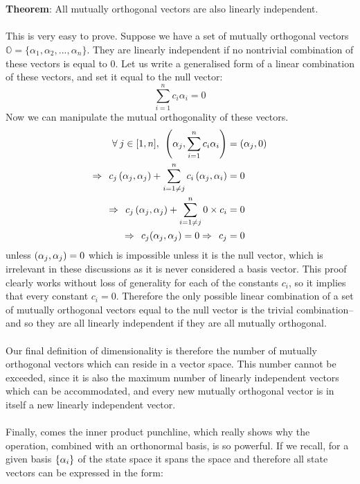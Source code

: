 \\\\
\textbf{Theorem}: All mutually orthogonal vectors are also linearly independent.
\\\\
This is very easy to prove. Suppose we have a set of mutually orthogonal vectors $\mathbb{O}=\{\alpha_{1}, \alpha_{2}, ..., \alpha_{n}\}$. They are linearly independent if no nontrivial combination of these vectors is equal to $0$. Let us write a generalised form of a linear combination of these vectors, and set it equal to the null vector:
$$
\sum_{i=1}^{n}c_{i}\alpha_{i}=0
$$
Now we can manipulate the mutual orthogonality of these vectors. 
$$
\begin{aligned}
\forall\: j \in [1,n], \:\: \left(\alpha_{j},\sum_{i=1}^{n}c_{i}\alpha_{i}\right) &=\left(\alpha_{j},0\right) \\ 
\Rightarrow\:\:  c_{j}\left(\alpha_{j},\alpha_{j}\right)+\sum_{i=1\neq j}^{n}c_{i}\left(\alpha_{j},\alpha_{i}\right) &= 0 \\
\Rightarrow\:\: c_{j}\left(\alpha_{j},\alpha_{j}\right)+\sum_{i=1\neq j}^{n}0\times c_{i} &= 0 \\ 
\Rightarrow\:\:  c_{j}(\alpha_{j},\alpha_{j})= 0 \Rightarrow\:\:c_{j} &= 0
\end{aligned}
$$
unless $\left(\alpha_{j},\alpha_{j}\right)=0$ which is impossible unless it is the null vector, which is irrelevant in these discussions as it is never considered a basis vector. This proof clearly works without loss of generality for each of the constants $c_{i}$, so it implies that every constant $c_{i}=0$. Therefore the only possible linear combination of a set of mutually orthogonal vectors equal to the null vector is the trivial combination-- and so they are all linearly independent if they are all mutually orthogonal.
\\\\
Our final definition of dimensionality is therefore the number of mutually orthogonal vectors which can reside in a vector space. This number cannot be exceeded, since it is also the maximum number of linearly independent vectors which can be accommodated, and every new mutually orthogonal vector is in itself a new linearly independent vector. 
\\\\
Finally, comes the inner product punchline, which really shows why the operation, combined with an orthonormal basis, is so powerful. If we recall, for a given basis $\{\alpha_{i}\}$ of the state space it spans the space and therefore all state vectors can be expressed in the form:
